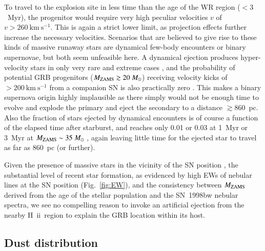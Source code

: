 \documentclass[traditabstract]{aa}
\newcommand{\hii}{\mbox{H~{\sc ii}}}
\begin{document}
To travel to the explosion site in less time than the age of the WR region ($<3$~Myr), the progenitor would require very high peculiar velocities $v$ of $v>260~\mathrm{km~s^{-1}}$. This is again a strict lower limit, as projection effects further increase the necessary velocities. Scenarios that are believed to give rise to these kinds of massive runaway stars are dynamical few-body encounters or binary supernovae, but both seem unfeasible here. A dynamical ejection produces hyper-velocity stars in only very rare and extreme cases \citep{2001A&A...365...49H, 2012ApJ...751..133P}, and the probability of potential GRB progenitors ($M_{\rm{ZAMS}}\gtrsim 20~M_\odot$) receiving velocity kicks of $>200~\mathrm{km~s^{-1}}$ from a companion SN is also practically zero \citep{2011MNRAS.414.3501E}. This makes a binary supernova origin highly implausible as there simply would not be enough time to evolve and explode the primary and eject the secondary to a distance $\gtrsim860$~pc. Also the fraction of stars ejected by dynamical encounters is of course a function of the elapsed time after starburst, and reaches only 0.01 or 0.03 at 1~Myr or 3~Myr at $M_{\rm{ZAMS}}\sim 35~M_\odot$ \citep{2012ApJ...746...15B}, again leaving little time for the ejected star to travel as far as 860~pc (or further).

Given the presence of massive stars in the vicinity of the SN position \citep{2000ApJ...542L..89F}, the substantial level of recent star formation, as evidenced by high EWs of nebular lines at the SN position (Fig.~\ref{fig:EW}), and the consistency between $M_{\rm{ZAMS}}$ derived from the age of the stellar population and the SN~1998bw nebular spectra, we see no compelling reason to invoke an artificial ejection from the nearby \hii\  region to explain the GRB location within its host.

\subsection{Dust distribution}
\end{document}
